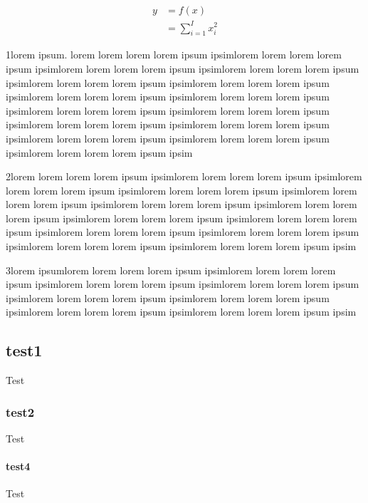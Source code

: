 
\begin{align}
    y &= f(x)\\
    &= \sum_{i=1}^I x_i^2
\end{align}


1lorem ipsum. lorem lorem lorem lorem ipsum ipsimlorem lorem lorem lorem ipsum ipsimlorem lorem lorem lorem ipsum ipsimlorem lorem lorem lorem ipsum ipsimlorem lorem lorem lorem ipsum ipsimlorem lorem lorem lorem ipsum ipsimlorem lorem lorem lorem ipsum ipsimlorem lorem lorem lorem ipsum ipsimlorem lorem lorem lorem ipsum ipsimlorem lorem lorem lorem ipsum ipsimlorem lorem lorem lorem ipsum ipsimlorem lorem lorem lorem ipsum ipsimlorem lorem lorem lorem ipsum ipsimlorem lorem lorem lorem ipsum ipsimlorem lorem lorem lorem ipsum ipsim

2lorem lorem lorem lorem ipsum ipsimlorem lorem lorem lorem ipsum ipsimlorem lorem lorem lorem ipsum ipsimlorem lorem lorem lorem ipsum ipsimlorem lorem lorem lorem ipsum ipsimlorem lorem lorem lorem ipsum ipsimlorem lorem lorem lorem ipsum ipsimlorem lorem lorem lorem ipsum ipsimlorem lorem lorem lorem ipsum ipsimlorem lorem lorem lorem ipsum ipsimlorem lorem lorem lorem ipsum ipsimlorem lorem lorem lorem ipsum ipsimlorem lorem lorem lorem ipsum ipsim

3lorem ipsumlorem lorem lorem lorem ipsum ipsimlorem lorem lorem lorem ipsum ipsimlorem lorem lorem lorem ipsum ipsimlorem lorem lorem lorem ipsum ipsimlorem lorem lorem lorem ipsum ipsimlorem lorem lorem lorem ipsum ipsimlorem lorem lorem lorem ipsum ipsimlorem lorem lorem lorem ipsum ipsim

\subsection{test1}

Test

\subsubsection{test2}

Test

\paragraph{test4}

Test
